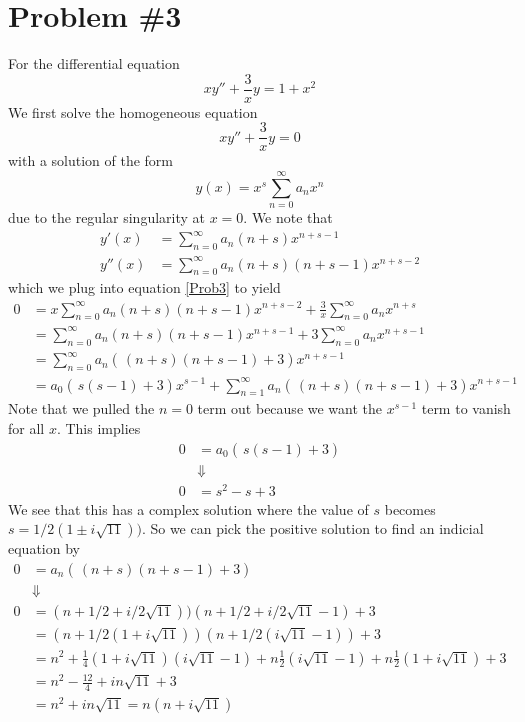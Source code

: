 \documentclass[11pt]{article}
\numberwithin{equation}{section}
\begin{document}
\section{Problem \#3}
For the differential equation
\begin{equation}
xy'' + \frac{3}{x}y = 1 + x^2
\label{Prob3}
\end{equation}
We first solve the homogeneous equation
$$xy''+\frac{3}{x}y=0$$
with a solution of the form
$$y(x) = x^{s}\sum_{n=0}^{\infty}a_nx^n$$
due to the regular singularity at $x=0$. We note that 
\begin{align*}
y'(x) &= \sum_{n=0}^{\infty}a_n(n+s)x^{n+s-1}\\
y''(x) &= \sum_{n=0}^{\infty}a_n(n+s)(n+s-1)x^{n+s-2}
\end{align*}
which we plug into equation \ref{Prob3} to yield
\begin{align*}
0 &= x\sum_{n=0}^{\infty}a_n(n+s)(n+s-1)x^{n+s-2} + \frac{3}{x}\sum_{n=0}^{\infty}a_nx^{n+s}\\
&= \sum_{n=0}^{\infty}a_n(n+s)(n+s-1)x^{n+s-1} + 3\sum_{n=0}^{\infty}a_nx^{n+s-1}\\
&= \sum_{n=0}^{\infty}a_n\left(\frac{}{}(n+s)(n+s-1) + 3\right)x^{n+s-1}\\
&= a_0\left(\frac{}{}s(s-1) + 3\right)x^{s-1} + \sum_{n=1}^{\infty}a_n\left(\frac{}{}(n+s)(n+s-1) + 3\right)x^{n+s-1}
\end{align*}
Note that we pulled the $n=0$ term out because we want the $x^{s-1}$ term to vanish for all
$x$. This implies
\begin{align*} 
0 &= a_0\left(\frac{}{}s(s-1) + 3\right)\\
&\Downarrow\\
0 &= s^2 - s + 3
\end{align*} 
We see that this has a complex solution where the value of $s$ becomes 
$s=1/2(1\pm i\sqrt{11}))$. So we can pick the positive solution to find an indicial equation
by
\begin{align*}
0 &= a_n\left(\frac{}{}(n+s)(n+s-1) + 3\right)\\
&\Downarrow\\
0 &= (n+1/2+i/2\sqrt{11}))(n+1/2+i/2\sqrt{11}-1) + 3\\
&= (n+1/2(1+i\sqrt{11}))(n+1/2(i\sqrt{11}-1)) + 3\\ 
&= n^2 + \frac{1}{4}(1+i\sqrt{11})(i\sqrt{11}-1) + n\frac{1}{2}(i\sqrt{11}-1) + n\frac{1}{2}(1+i\sqrt{11}) + 3\\
&= n^2 - \frac{12}{4} + in\sqrt{11} + 3\\
&= n^2  + in\sqrt{11} = n(n+i\sqrt{11})
\end{align*}
\end{document}
